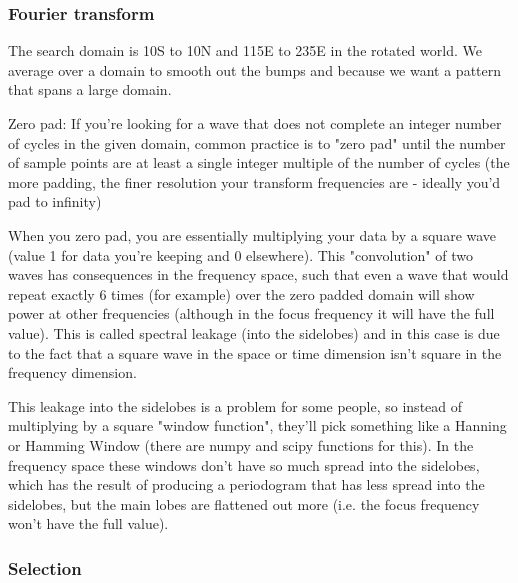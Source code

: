 \subsubsection{Fourier transform}

The search domain is 10S to 10N and 115E to 235E in the rotated world. We average over a domain to smooth out the bumps and because we want a pattern that spans a large domain.

Zero pad: If you're looking for a wave that does not complete an integer number of cycles in the given domain, common practice is to "zero pad" until the number of sample points are at least a single integer multiple of the number of cycles (the more padding, the finer resolution your transform frequencies are - ideally you'd pad to infinity)

When you zero pad, you are essentially multiplying your data by a square wave (value 1 for data you're keeping and 0 elsewhere). This "convolution" of two waves has consequences in the frequency space, such that even a wave that would repeat exactly 6 times (for example) over the zero padded domain will show power at other frequencies (although in the focus frequency it will have the full value). This is called spectral leakage (into the sidelobes) and in this case is due to the fact that a square wave in the space or time dimension isn't square in the frequency dimension.

This leakage into the sidelobes is a problem for some people, so instead of multiplying by a square "window function", they'll pick something like a Hanning or Hamming Window (there are numpy and scipy functions for this). In the frequency space these windows don't have so much spread into the sidelobes, which has the result of producing a periodogram that has less spread into the sidelobes, but the main lobes are flattened out more (i.e. the focus frequency won't have the full value).

\subsubsection{Selection}


